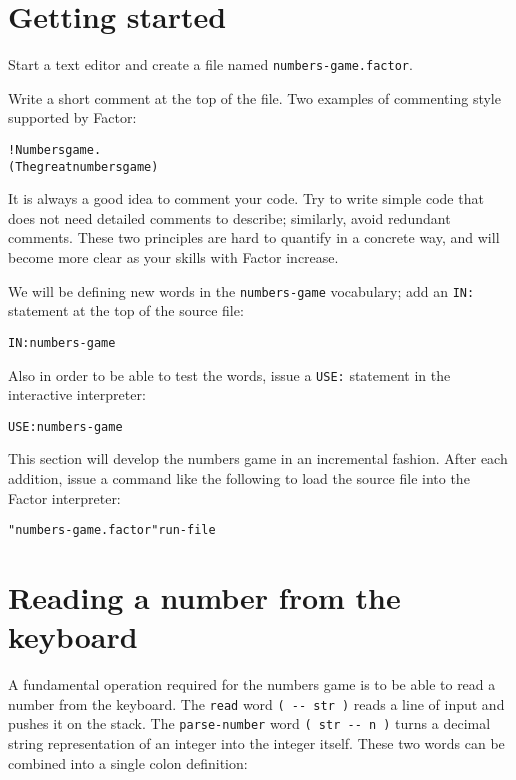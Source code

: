 \documentclass[english]{book}
\begin{document}
\section{Getting started}

Start a text editor and create a file named \texttt{numbers-game.factor}.

Write a short comment at the top of the file. Two examples of commenting style supported by Factor:

\begin{alltt}
! Numbers game.
( The great numbers game )
\end{alltt}

It is always a good idea to comment your code. Try to write simple
code that does not need detailed comments to describe; similarly,
avoid redundant comments. These two principles are hard to quantify
in a concrete way, and will become more clear as your skills with
Factor increase.

We will be defining new words in the \texttt{numbers-game} vocabulary; add
an \texttt{IN:} statement at the top of the source file:

\begin{alltt}
IN: numbers-game
\end{alltt}
Also in order to be able to test the words, issue a \texttt{USE:}
statement in the interactive interpreter:

\begin{alltt}
USE: numbers-game
\end{alltt}
This section will develop the numbers game in an incremental fashion.
After each addition, issue a command like the following to load the
source file into the Factor interpreter:

\begin{alltt}
"numbers-game.factor" run-file
\end{alltt}

\section{Reading a number from the keyboard}

A fundamental operation required for the numbers game is to be able
to read a number from the keyboard. The \texttt{read} word \texttt{(
-{}- str )} reads a line of input and pushes it on the stack.
The \texttt{parse-number} word \texttt{( str -{}- n )} turns a decimal
string representation of an integer into the integer itself. These
two words can be combined into a single colon definition:
\end{document}
